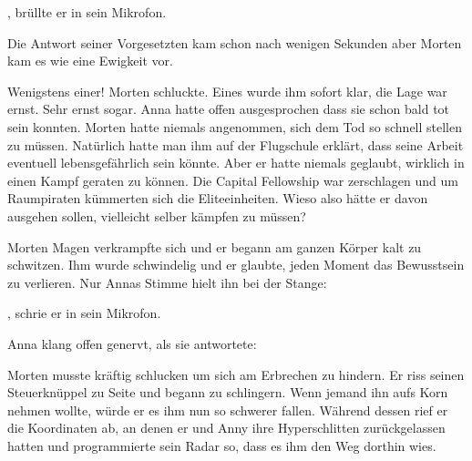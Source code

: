 \par

, brüllte er in sein Mikrofon. 

\par

Die Antwort seiner Vorgesetzten kam schon nach wenigen Sekunden aber Morten kam es wie eine Ewigkeit vor. 

\par

Wenigstens einer! Morten schluckte. Eines wurde ihm sofort klar, die Lage war ernst. Sehr ernst sogar. Anna hatte offen ausgesprochen dass sie schon bald tot sein konnten. Morten hatte niemals angenommen, sich dem Tod so schnell stellen zu müssen. Natürlich hatte man ihm auf der Flugschule erklärt, dass seine Arbeit eventuell lebensgefährlich sein könnte. Aber er hatte niemals geglaubt, wirklich in einen Kampf geraten zu können. Die Capital Fellowship war zerschlagen und um Raumpiraten kümmerten sich die Eliteeinheiten. Wieso also hätte er davon ausgehen sollen, vielleicht selber kämpfen zu müssen?

\par

Morten Magen verkrampfte sich und er begann am ganzen Körper kalt zu schwitzen. Ihm wurde schwindelig und er glaubte, jeden Moment das Bewusstsein zu verlieren. Nur Annas Stimme hielt ihn bei der Stange: 

\par

, schrie er in sein Mikrofon.

\par

Anna klang offen genervt, als sie antwortete: 

\par

Morten musste kräftig schlucken um sich am Erbrechen zu hindern. Er riss seinen Steuerknüppel zu Seite und begann zu schlingern. Wenn jemand ihn aufs Korn nehmen wollte, würde er es ihm nun so schwerer fallen. Während dessen rief er die Koordinaten ab, an denen er und Anny ihre Hyperschlitten zurückgelassen hatten und programmierte sein Radar so, dass es ihm den Weg dorthin wies.

